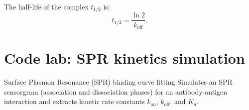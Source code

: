 \documentclass[12pt, a4paper, oneside]{report}
\begin{document}
The half-life of the complex $t_{1/2}$ is:
\begin{equation}
  t_{1/2} = \frac{\ln 2}{k_{\text{off}}}.
  \label{eq:complex_half_life}
\end{equation}

\section{Code lab: SPR kinetics simulation}

\begin{codelab}{Surface Plasmon Resonance (SPR) binding curve fitting}
  Simulates an SPR sensorgram (association and dissociation phases) for an antibody-antigen interaction and extracts kinetic rate constants $k_{\text{on}}$, $k_{\text{off}}$, and $K_d$.
\end{codelab}
\end{document}
